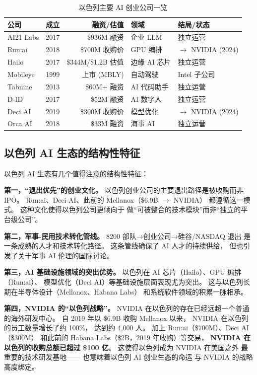 \begin{table}[htbp]
\centering
\caption{以色列主要 AI 创业公司一览}
\label{tab:israel-ai}
\small
\begin{tabularx}{\textwidth}{l l r l X}
\toprule
\rowcolor{figLightGray}
\textbf{公司} & \textbf{成立} & \textbf{融资/估值} & \textbf{领域} & \textbf{结局/状态} \\
\midrule
AI21 Labs   & 2017 & \$936M 融资      & 企业 LLM     & 独立运营 \\
Run:ai      & 2018 & \$700M 收购价    & GPU 编排     & $\to$ NVIDIA (2024) \\
Hailo       & 2017 & \$344M/\$1.2B 估值 & 边缘 AI 芯片 & 独立运营 \\
Mobileye    & 1999 & 上市 (MBLY)       & 自动驾驶     & Intel 子公司 \\
Tabnine     & 2013 & \$60M+ 融资      & AI 代码助手  & 独立运营 \\
D-ID        & 2017 & \$52M 融资       & AI 数字人    & 独立运营 \\
Deci AI     & 2019 & \$300M 收购价    & 模型优化     & $\to$ NVIDIA (2024) \\
Orca AI     & 2018 & \$33M 融资       & 海事 AI      & 独立运营 \\
\bottomrule
\end{tabularx}
\end{table}

\subsection{以色列 AI 生态的结构性特征}

以色列 AI 生态有几个值得注意的结构性特征：

\textbf{第一，``退出优先''的创业文化。}
以色列创业公司的主要退出路径是被收购而非 IPO。
Run:ai、Deci AI、此前的 Mellanox（\$6.9B $\to$ NVIDIA）
都遵循这一模式。
这种文化使得以色列公司更倾向于
做``可被整合的技术模块''而非``独立的平台级公司''。

\textbf{第二，军事-民用技术转化管线。}
8200 部队→创业公司→硅谷/NASDAQ 退出
是一条成熟的人才和技术转化路径。
这条管线确保了 AI 人才的持续供给，
但也引发了关于军事 AI 伦理的国际讨论。

\textbf{第三，AI 基础设施领域的突出优势。}
以色列在 AI 芯片（Hailo）、GPU 编排（Run:ai）、
模型优化（Deci AI）等基础设施层面表现尤为突出。
这与以色列长期在半导体设计（Mellanox、Habana Labs）
和系统软件领域的积累一脉相承。

\textbf{第四，NVIDIA 的``以色列战略''。}
NVIDIA 在以色列的存在已经远超一个普通的海外研发中心。
自 2019 年以 \$6.9B 收购 Mellanox 以来，
NVIDIA 在以色列的员工数量增长了约 100\%，
达到约 4,000 人。
加上 Run:ai（\$700M）、Deci AI（\$300M）
和此前的 Habana Labs（\$2B，2019 年收购）等交易，
\textbf{NVIDIA 在以色列的收购总额已超过 \$100 亿}。
这使得以色列成为 NVIDIA 在美国之外
最重要的技术研发基地——
也意味着以色列 AI 创业生态的命运
与 NVIDIA 的战略高度绑定。

